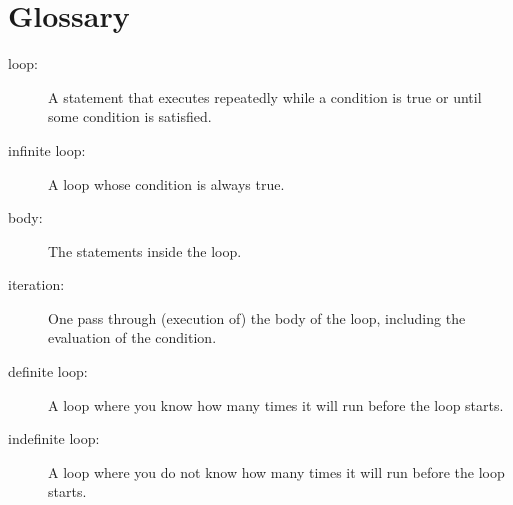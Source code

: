 \section{Glossary}

\begin{description}

\item[loop:]  A statement that executes repeatedly while a
condition is true or until some condition is satisfied.

\item[infinite loop:]  A loop whose condition is always true.

\item[body:]  The statements inside the loop.

\item[iteration:]  One pass through (execution of) the body
of the loop, including the evaluation of the condition.

\item[definite loop:]  A loop where you know how many times
it will run before the loop starts.

\item[indefinite loop:]  A loop where you do not know how many
times it will run before the loop starts.




\end{description}

